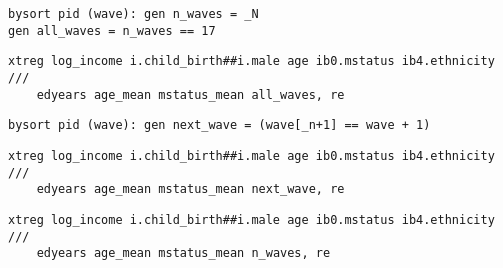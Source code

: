 

\begin{verbatim}
bysort pid (wave): gen n_waves = _N
gen all_waves = n_waves == 17
\end{verbatim}

\begin{verbatim}
xtreg log_income i.child_birth##i.male age ib0.mstatus ib4.ethnicity ///
    edyears age_mean mstatus_mean all_waves, re
\end{verbatim}


\begin{verbatim}
bysort pid (wave): gen next_wave = (wave[_n+1] == wave + 1)
\end{verbatim}

\begin{verbatim}
xtreg log_income i.child_birth##i.male age ib0.mstatus ib4.ethnicity ///
    edyears age_mean mstatus_mean next_wave, re
\end{verbatim}


\begin{verbatim}
xtreg log_income i.child_birth##i.male age ib0.mstatus ib4.ethnicity ///
    edyears age_mean mstatus_mean n_waves, re
\end{verbatim}

